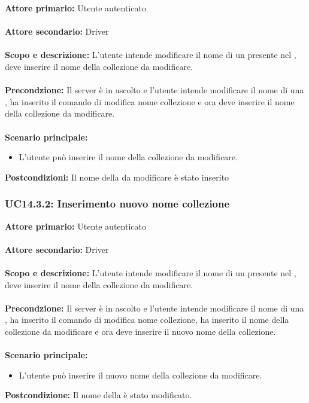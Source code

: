 \documentclass{scalatekids-article}
\begin{document}
\textbf{Attore primario:} Utente autenticato\\ \\
\textbf{Attore secondario:} Driver\\ \\
\textbf{Scopo e descrizione:} L'utente intende modificare il nome di un  presente nel , deve inserire il nome della collezione da modificare.\\ \\
\textbf{Precondzione:} Il server è in ascolto e l'utente intende modificare il nome di una , ha inserito il comando di modifica nome collezione e ora deve inserire il nome della collezione da modificare.\\ \\
\textbf{Scenario principale:}
\begin{itemize}
\item L'utente può inserire il nome della collezione da modificare.
\end{itemize}
\textbf{Postcondizioni:} Il nome della  da modificare è stato inserito

\subsubsection{UC14.3.2: Inserimento nuovo nome collezione}

\textbf{Attore primario:} Utente autenticato\\ \\
\textbf{Attore secondario:} Driver\\ \\
\textbf{Scopo e descrizione:} L'utente intende modificare il nome di un  presente nel , deve inserire il nome della collezione da modificare.\\ \\
\textbf{Precondzione:} Il server è in ascolto e l'utente intende modificare il nome di una , ha inserito il comando di modifica nome collezione, ha inserito il nome della collezione da modificare e ora deve inserire il nuovo nome della collezione.\\ \\
\textbf{Scenario principale:}
\begin{itemize}
\item L'utente può inserire il nuovo nome della collezione da modificare.
\end{itemize}
\textbf{Postcondizione:} Il nome della  è stato modificato.
\end{document}
